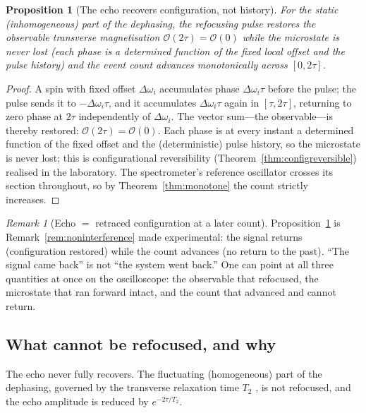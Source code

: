 \documentclass[11pt,a4paper]{article}
\theoremstyle{thmstyle}
\newtheorem{proposition}[theorem]{Proposition}
\theoremstyle{definition}
\theoremstyle{remark}
\newtheorem{remark}[theorem]{Remark}
\newcommand{\Obs}{\mathcal{O}}
\begin{document}
\begin{proposition}[The echo recovers configuration, not history]
\label{prop:echorecovery}
For the static (inhomogeneous) part of the dephasing, the refocusing pulse
restores the observable transverse magnetisation
$\Obs(2\tau)=\Obs(0)$ while the microstate is never lost (each phase is a
determined function of the fixed local offset and the pulse history) and
the event count advances monotonically across $[0,2\tau]$.
\end{proposition}

\begin{proof}
A spin with fixed offset $\Delta\omega_i$ accumulates phase
$\Delta\omega_i\tau$ before the pulse; the pulse sends it to
$-\Delta\omega_i\tau$, and it accumulates $\Delta\omega_i\tau$ again in
$[\tau,2\tau]$, returning to zero phase at $2\tau$ independently of
$\Delta\omega_i$. The vector sum---the observable---is thereby restored:
$\Obs(2\tau)=\Obs(0)$. Each phase is at every instant a determined function
of the fixed offset and the (deterministic) pulse history, so the microstate
is never lost; this is configurational reversibility
(Theorem~\ref{thm:configreversible}) realised in the laboratory. The
spectrometer's reference oscillator crosses its section throughout, so by
Theorem~\ref{thm:monotone} the count strictly increases.
\end{proof}

\begin{remark}[Echo $=$ retraced configuration at a later count]
\label{rem:echolater}
Proposition~\ref{prop:echorecovery} is Remark~\ref{rem:noninterference}
made experimental: the signal returns (configuration restored) while the
count advances (no return to the past). ``The signal came back'' is not
``the system went back.'' One can point at all three quantities at once on
the oscilloscope: the observable that refocused, the microstate that ran
forward intact, and the count that advanced and cannot return.
\end{remark}

\subsection{What cannot be refocused, and why}
\label{sec:irreducible}

The echo never fully recovers. The fluctuating (homogeneous) part of the
dephasing, governed by the transverse relaxation time $T_2$
\citep{bpp1948}, is not refocused, and the echo amplitude is reduced by
$e^{-2\tau/T_2}$.
\end{document}
